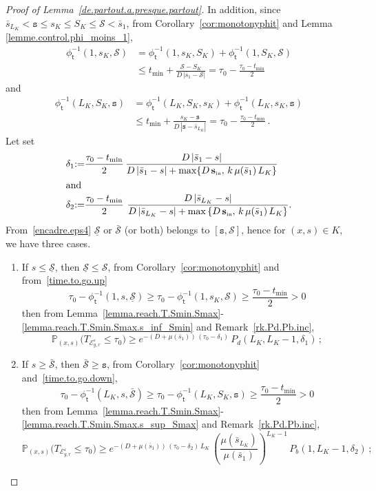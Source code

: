 \documentclass[10pt]{amsart}
\theoremstyle{definition}\newtheorem{defi}[theo]{Definition}\newtheorem{rema}[theo]{Remark}\newtheorem{exam}[theo]{Example}\newtheorem{exem}[theo]{Example}\newtheorem{nota}[theo]{Notation}
\newcommand{\PP}{\mathbb{P}}
\newcommand{\clE}{\mathcal{E}}
\newcommand{\clS}{\mathcal{S}}
\newcommand{\Sin}{{\mathbf s}_{\textrm{\tiny\rm in}}}
\newcommand{\Smin}{\underline{\mathcal{S}}}
\newcommand{\Smax}{\bar{\mathcal{S}}}
\newcommand{\SminK}{s_K}
\newcommand{\SmaxK}{S_K}
\newcommand{\barmu}{\mu(\bar s_1)}
\newcommand{\phit}{\phi_\textsf{t}^{-1}}
\newcommand{\lmax}{{L_K}}
\newcommand{\1}{\mathbf{1}}
\begin{document}
\begin{proof}[Proof of Lemma~\ref{de.partout.a.presque.partout}]
In addition, since $\bar s_{\lmax}\!<\!\texttt{s}\!\leq\!\SminK\!\leq\!\SmaxK\!\leq\!\clS\!<\!\bar s_1$, from Corollary~\ref{cor:monotonyphit} and Lemma \ref{lemme.control.phi_moins_1},
\begin{equation}\label{time.to.go.up}
\begin{split}
\phit\left(1,\SminK,\clS\right) &=
\phit\left(1,\SminK,\SmaxK\right) +
\phit\left(1,\SmaxK,\clS\right)\\
&\leq t_{\min} +
\frac{\clS-\SmaxK}{D\,|\bar s_1-\clS|} 
= \tau_0 -
\frac{\tau_0-t_{\min}}{2}
\end{split}
\end{equation}
and
\begin{equation}\label{time.to.go.down}
\begin{split}
\phit\left(\lmax,\SmaxK,\texttt{s}\right)&=
\phit\left(\lmax,\SmaxK,\SminK\right) +
\phit\left(\lmax,\SminK,\texttt{s}\right)\\
 &\leq t_{\min} +\frac{\SminK-\texttt{s}}{D\,|\texttt{s}-\bar s_\lmax|} = \tau_0 -
\frac{\tau_0-t_{\min}}{2}\,.
\end{split}
\end{equation}
Let set 
\begin{align*}
\delta_1 &{:=}\frac{\tau_0-t_{\min}}{2}\,\frac{D\,|\bar s_1-s|}{D\,|\bar s_1-s|+\max\{D\,\Sin,\,k\,\barmu\,\lmax\}}\\
\intertext{and}
\delta_2 &{:=}\frac{\tau_0-t_{\min}}{2}\,\,\frac{D\,|\bar s_\lmax-s|}{D\,|\bar s_\lmax-s|+\max\left\{D\,\Sin,\,k\,\barmu\,\lmax\right\}}.
\end{align*}
From~\eqref{encadre.eps4} $\Smin$ or $\Smax$ (or both) belongs to $[\texttt{s}, \clS]$, hence for $(x,s)\in K$, we have three cases.
\begin{enumerate}
\item If $s\leq \Smin$, then $\Smin \leq \clS$, from Corollary~\ref{cor:monotonyphit} and from~\eqref{time.to.go.up}
\[
\tau_0-\phit\left(1,s,\Smin\right)
\geq \tau_0 - \phit\left(1,\SminK,\clS\right)
\geq \frac{\tau_0-t_{\min}}{2} >0
\]
then from Lemma~\ref{lemma.reach.T.Smin.Smax}-\ref{lemma.reach.T.Smin.Smax.s_inf_Smin} and Remark~\ref{rk.Pd.Pb.inc},
\[
\PP_{(x,s)}\big(T_{\clE_{y,r}^\varepsilon}
\leq \tau_0\big)\geq e^{-(D+\barmu)\,(\tau_0-\delta_1)}\,P_d(\lmax,\lmax-1,\delta_1)\,;
\]

\item If $s\geq \Smax$, then $\Smax \geq \texttt{s}$, from Corollary~\ref{cor:monotonyphit} and~\eqref{time.to.go.down},
\[
\tau_0-\phit\left(\lmax,s,\Smax\right)
\geq \tau_0-\phit\left(\lmax,\SmaxK,\texttt{s}\right)
\geq\frac{\tau_0-t_{\min}}{2}>0
\]
then from Lemma~\ref{lemma.reach.T.Smin.Smax}-\ref{lemma.reach.T.Smin.Smax.s_sup_Smax} and Remark~\ref{rk.Pd.Pb.inc},
\[
\PP_{(x,s)}\big(T_{\clE_{y,r}^\varepsilon}
\leq \tau_0\big)\geq e^{-(D+\barmu)\,(\tau_0-\delta_2)\,\lmax}\,
\left(\frac{\mu(\bar s_{\lmax})}{\barmu}\right)^{\lmax-1}\,P_b(1,\lmax-1, \delta_2)\,;
\]


\end{enumerate}
\end{proof}
\end{document}
